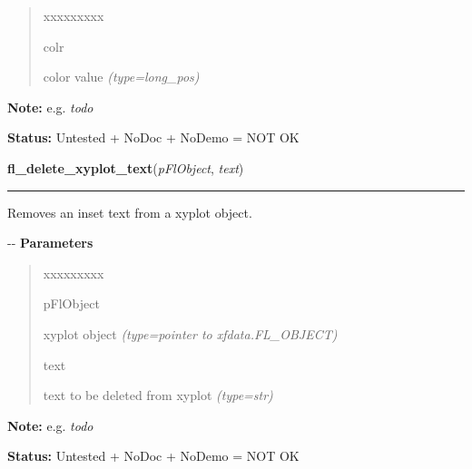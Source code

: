 \begin{boxedminipage}{\funcwidth}
\begin{quote}
\begin{Ventry}{xxxxxxxxx}
          \item[colr]


color value
            {\it (type=long\_pos)}

        \end{Ventry}

      \end{quote}

\textbf{Note:} 
e.g. \emph{todo}


\textbf{Status:} 
Untested + NoDoc + NoDemo = NOT OK


    \end{boxedminipage}

    \label{xformslib:flxyplot:fl_delete_xyplot_text}

    \vspace{0.5ex}

\hspace{.8\funcindent}\begin{boxedminipage}{\funcwidth}

    \raggedright \textbf{fl\_delete\_xyplot\_text}(\textit{pFlObject}, \textit{text})

    \vspace{-1.5ex}

    \rule{\textwidth}{0.5\fboxrule}
\setlength{\parskip}{2ex}

Removes an inset text from a xyplot object.

-{}-
\setlength{\parskip}{1ex}
      \textbf{Parameters}
      \vspace{-1ex}

      \begin{quote}
        \begin{Ventry}{xxxxxxxxx}

          \item[pFlObject]


xyplot object
            {\it (type=pointer to xfdata.FL\_OBJECT)}

          \item[text]


text to be deleted from xyplot
            {\it (type=str)}

        \end{Ventry}

      \end{quote}

\textbf{Note:} 
e.g. \emph{todo}


\textbf{Status:} 
Untested + NoDoc + NoDemo = NOT OK


    \end{boxedminipage}

